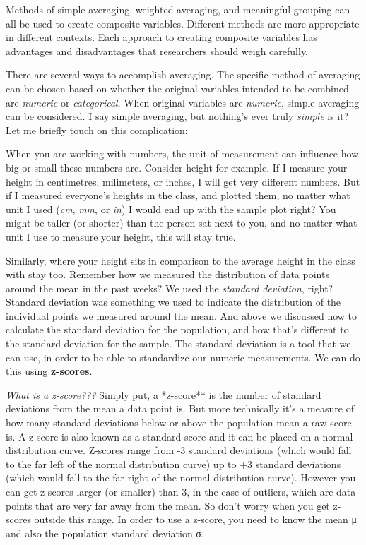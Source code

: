 \documentclass[]{book}
\theoremstyle{definition}
\theoremstyle{definition}
\theoremstyle{definition}
\theoremstyle{remark}
\begin{document}
Methods of simple averaging, weighted averaging, and meaningful grouping
can all be used to create composite variables. Different methods are
more appropriate in different contexts. Each approach to creating
composite variables has advantages and disadvantages that researchers
should weigh carefully.

There are several ways to accomplish averaging. The specific method of
averaging can be chosen based on whether the original variables intended
to be combined are \emph{numeric} or \emph{categorical}. When original
variables are \emph{numeric}, simple averaging can be considered. I say
simple averaging, but nothing's ever truly \emph{simple} is it? Let me
briefly touch on this complication:

When you are working with numbers, the unit of measurement can influence
how big or small these numbers are. Consider height for example. If I
measure your height in centimetres, milimeters, or inches, I will get
very different numbers. But if I measured everyone's heights in the
class, and plotted them, no matter what unit I used (\emph{cm},
\emph{mm}, or \emph{in}) I would end up with the sample plot right? You
might be taller (or shorter) than the person sat next to you, and no
matter what unit I use to measure your height, this will stay true.

Similarly, where your height sits in comparison to the average height in
the class with stay too. Remember how we measured the distribution of
data points around the mean in the past weeks? We used the
\emph{standard deviation}, right? Standard deviation was something we
used to indicate the distribution of the individual points we measured
around the mean. And above we discussed how to calculate the standard
deviation for the population, and how that's different to the standard
deviation for the sample. The standard deviation is a tool that we can
use, in order to be able to standardize our numeric measurements. We can
do this using \textbf{z-scores}.

\emph{What is a z-score???} Simply put, a *z-score** is the number of
standard deviations from the mean a data point is. But more technically
it's a measure of how many standard deviations below or above the
population mean a raw score is. A z-score is also known as a standard
score and it can be placed on a normal distribution curve. Z-scores
range from -3 standard deviations (which would fall to the far left of
the normal distribution curve) up to +3 standard deviations (which would
fall to the far right of the normal distribution curve). However you can
get z-scores larger (or smaller) than 3, in the case of outliers, which
are data points that are very far away from the mean. So don't worry
when you get z-scores outside this range. In order to use a z-score, you
need to know the mean μ and also the population standard deviation σ.
\end{document}
